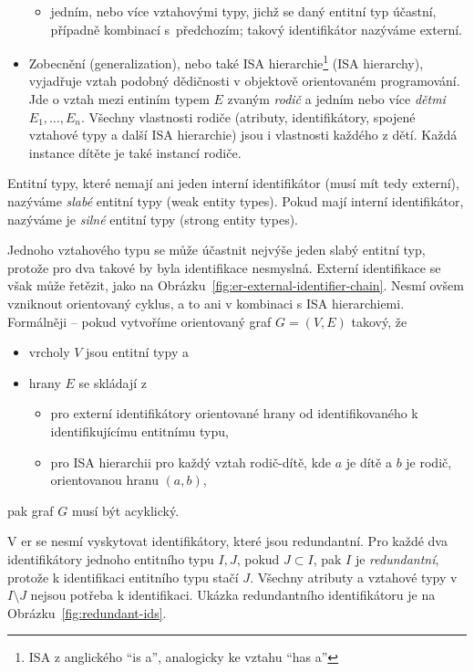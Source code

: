 \begin{itemize}
\begin{itemize}
          \item jedním, nebo více vztahovými typy, jichž se daný entitní typ účastní, případně kombinací s~předchozím; takový identifikátor nazýváme externí.
        \end{itemize}
  \item Zobecnění (generalization), nebo také ISA hierarchie\footnote{ISA z anglického \enquote{is a}, analogicky ke vztahu \enquote{has a}} (ISA hierarchy), vyjadřuje vztah podobný dědičnosti v objektově orientovaném programování.
        Jde o vztah mezi entiním typem $E$ zvaným \emph{rodič} a jedním nebo více \emph{dětmi} $E_1, \dots, E_n$.
        Všechny vlastnosti rodiče (atributy, identifikátory, spojené vztahové typy a další ISA hierarchie) jsou i vlastnosti každého z dětí.
        Každá instance dítěte je také instancí rodiče.
\end{itemize}

Entitní typy, které nemají ani jeden interní identifikátor (musí mít tedy externí), nazýváme \emph{slabé} entitní typy (weak entity types).
Pokud mají interní identifikátor, nazýváme je \emph{silné} entitní typy (strong entity types).

Jednoho vztahového typu se může účastnit nejvýše jeden slabý entitní typ, protože pro dva takové by byla identifikace nesmyslná.
Externí identifikace se však může řetězit, jako na Obrázku~\ref{fig:er-external-identifier-chain}.
Nesmí ovšem vzniknout orientovaný cyklus, a to ani v kombinaci s ISA hierarchiemi.
Formálněji -- pokud vytvoříme orientovaný graf $G=(V,E)$ takový, že
\begin{itemize}
  \item vrcholy $V$ jsou entitní typy a
  \item hrany $E$ se skládají z
        \begin{itemize}
          \item pro externí identifikátory orientované hrany od identifikovaného k identifikujícímu entitnímu typu,
          \item pro ISA hierarchii pro každý vztah rodič-dítě, kde $a$ je dítě a $b$ je rodič, orientovanou hranu $(a, b)$,
        \end{itemize}
\end{itemize}
pak graf $G$ musí být acyklický.

V \acrshort{er} se nesmí vyskytovat identifikátory, které jsou redundantní.
Pro každé dva identifikátory jednoho entitního typu $I, J$, pokud $J\subset I$, pak $I$ je \emph{redundantní}, protože k identifikaci entitního typu stačí $J$.
Všechny atributy a vztahové typy v $I\setminus J$ nejsou potřeba k identifikaci.
Ukázka redundantního identifikátoru je na Obrázku~\ref{fig:redundant-ids}.

